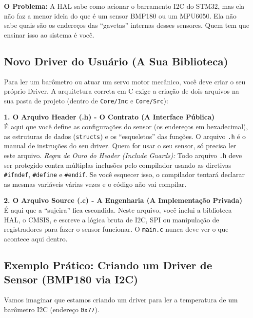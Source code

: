 \documentclass[12pt,a4paper]{article}
\begin{document}
\textbf{O Problema:} A HAL sabe como acionar o barramento I2C do STM32, mas ela não faz a menor ideia do que é um sensor BMP180 ou um MPU6050. Ela não sabe quais são os endereços das ``gavetas'' internas desses sensores. Quem tem que ensinar isso ao sistema é você.

\subsection{Novo Driver do Usuário (A Sua Biblioteca)}
Para ler um barômetro ou atuar um servo motor mecânico, você deve criar o seu próprio Driver. A arquitetura correta em C exige a criação de dois arquivos na sua pasta de projeto (dentro de \texttt{Core/Inc} e \texttt{Core/Src}):

\vspace{0.3cm}
\noindent\textbf{1. O Arquivo Header (.h) - O Contrato (A Interface Pública)}\\
É aqui que você define as configurações do sensor (os endereços em hexadecimal), as estruturas de dados (\texttt{structs}) e os ``esqueletos'' das funções. O arquivo \texttt{.h} é o manual de instruções do seu driver. Quem for usar o seu sensor, só precisa ler este arquivo.
\textit{Regra de Ouro do Header (Include Guards):} Todo arquivo \texttt{.h} deve ser protegido contra múltiplas inclusões pelo compilador usando as diretivas \texttt{\#ifndef}, \texttt{\#define} e \texttt{\#endif}. Se você esquecer isso, o compilador tentará declarar as mesmas variáveis várias vezes e o código não vai compilar.

\vspace{0.3cm}
\noindent\textbf{2. O Arquivo Source (.c) - A Engenharia (A Implementação Privada)}\\
É aqui que a ``sujeira'' fica escondida. Neste arquivo, você inclui a biblioteca HAL, o CMSIS, e escreve a lógica bruta de I2C, SPI ou manipulação de registradores para fazer o sensor funcionar. O \texttt{main.c} nunca deve ver o que acontece aqui dentro.

\subsection{Exemplo Prático: Criando um Driver de Sensor (BMP180 via I2C)}
Vamos imaginar que estamos criando um driver para ler a temperatura de um barômetro I2C (endereço \texttt{0x77}).
\end{document}
